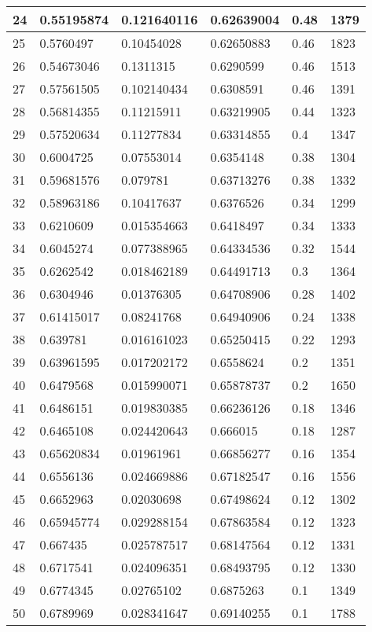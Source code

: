 \begin{longtable}{|l|l|l|l|l|l|}
24 & 0.55195874 & 0.121640116 & 0.62639004 & 0.48 & 1379 \\ \hline 
25 & 0.5760497 & 0.10454028 & 0.62650883 & 0.46 & 1823 \\ \hline 
26 & 0.54673046 & 0.1311315 & 0.6290599 & 0.46 & 1513 \\ \hline 
27 & 0.57561505 & 0.102140434 & 0.6308591 & 0.46 & 1391 \\ \hline 
28 & 0.56814355 & 0.11215911 & 0.63219905 & 0.44 & 1323 \\ \hline 
29 & 0.57520634 & 0.11277834 & 0.63314855 & 0.4 & 1347 \\ \hline 
30 & 0.6004725 & 0.07553014 & 0.6354148 & 0.38 & 1304 \\ \hline 
31 & 0.59681576 & 0.079781 & 0.63713276 & 0.38 & 1332 \\ \hline 
32 & 0.58963186 & 0.10417637 & 0.6376526 & 0.34 & 1299 \\ \hline 
33 & 0.6210609 & 0.015354663 & 0.6418497 & 0.34 & 1333 \\ \hline 
34 & 0.6045274 & 0.077388965 & 0.64334536 & 0.32 & 1544 \\ \hline 
35 & 0.6262542 & 0.018462189 & 0.64491713 & 0.3 & 1364 \\ \hline 
36 & 0.6304946 & 0.01376305 & 0.64708906 & 0.28 & 1402 \\ \hline 
37 & 0.61415017 & 0.08241768 & 0.64940906 & 0.24 & 1338 \\ \hline 
38 & 0.639781 & 0.016161023 & 0.65250415 & 0.22 & 1293 \\ \hline 
39 & 0.63961595 & 0.017202172 & 0.6558624 & 0.2 & 1351 \\ \hline 
40 & 0.6479568 & 0.015990071 & 0.65878737 & 0.2 & 1650 \\ \hline 
41 & 0.6486151 & 0.019830385 & 0.66236126 & 0.18 & 1346 \\ \hline 
42 & 0.6465108 & 0.024420643 & 0.666015 & 0.18 & 1287 \\ \hline 
43 & 0.65620834 & 0.01961961 & 0.66856277 & 0.16 & 1354 \\ \hline 
44 & 0.6556136 & 0.024669886 & 0.67182547 & 0.16 & 1556 \\ \hline 
45 & 0.6652963 & 0.02030698 & 0.67498624 & 0.12 & 1302 \\ \hline 
46 & 0.65945774 & 0.029288154 & 0.67863584 & 0.12 & 1323 \\ \hline 
47 & 0.667435 & 0.025787517 & 0.68147564 & 0.12 & 1331 \\ \hline 
48 & 0.6717541 & 0.024096351 & 0.68493795 & 0.12 & 1330 \\ \hline 
49 & 0.6774345 & 0.02765102 & 0.6875263 & 0.1 & 1349 \\ \hline 
50 & 0.6789969 & 0.028341647 & 0.69140255 & 0.1 & 1788 \\ \hline 
\end{longtable}